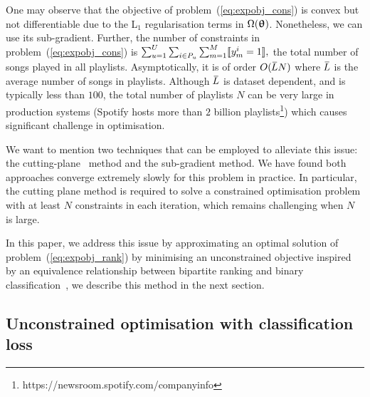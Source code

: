 One may observe that the objective of problem~(\ref{eq:expobj_cons}) is convex but not differentiable due to 
the L$_1$ regularisation terms in $\Omega({\bm{\uptheta}})$.
Nonetheless, we can use its sub-gradient.
Further, the number of constraints in problem~(\ref{eq:expobj_cons}) is
$
\sum_{u=1}^U \sum_{i \in P_u} \sum_{m=1}^M \llbracket y_m^i = 1 \rrbracket,
$
\ie the total number of songs played in all playlists.
Asymptotically, it is of order $O(\widebar{L} N)$ where $\widebar{L}$ is the average number of songs in playlists.
Although $\widebar{L}$ is dataset dependent, and is typically less than $100$,
the total number of playlists $N$ can be very large in production systems 
(\eg Spotify hosts more than $2$ billion playlists\footnote{https://newsroom.spotify.com/companyinfo})
which causes significant challenge in optimisation. 

We want to mention two techniques that can be employed to alleviate this issue:
the cutting-plane~\cite{avriel2003nonlinear} method and the sub-gradient method.
We have found both approaches converge extremely slowly for this problem in practice.
In particular, the cutting plane method is required to solve %
a constrained optimisation problem with at least $N$ constraints in each iteration, 
which remains challenging when $N$ is large.

In this paper, we address this issue by
approximating an optimal solution of problem~(\ref{eq:expobj_rank}) by minimising an unconstrained objective inspired
by an equivalence relationship between bipartite 
ranking and binary classification~\cite{ertekin2011equivalence}, we describe this method in the next section.




\subsection{Unconstrained optimisation with classification loss}

